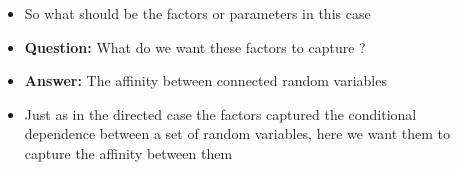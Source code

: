 \begin{frame}
	\begin{columns}
		\begin{overlayarea}{\textwidth}{\textheight}
		\vspace{0.1in}
		\begin{center}
		\end{center}
		\end{overlayarea}
		\begin{overlayarea}{\textwidth}{\textheight}
			\begin{itemize}\justifying
			\item<1-> So what should be the factors or parameters in this case
			\item<2-> \textbf{Question:} What do we want these factors to capture ?
			\item<3-> \textbf{Answer:} The affinity between connected random variables
			\item<4-> Just as in the directed case the factors captured the conditional dependence between a set of random 
			variables, here we want them to capture the affinity between them
			\end{itemize}
		\end{overlayarea}
	\end{columns}
\end{frame}

